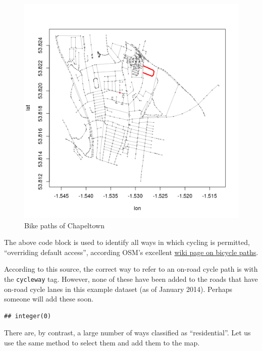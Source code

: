 \documentclass[]{article}
\newenvironment{Shaded}{}{}
\newcommand{\KeywordTok}[1]{\textcolor[rgb]{0.00,0.44,0.13}{\textbf{{#1}}}}
\newcommand{\StringTok}[1]{\textcolor[rgb]{0.25,0.44,0.63}{{#1}}}
\newcommand{\NormalTok}[1]{{#1}}
\begin{document}
\begin{figure}[htbp]
\centering
\includegraphics{figure/Bike_paths_of_Chapeltown.png}
\caption{Bike paths of Chapeltown}
\end{figure}

The above code block is used to identify all ways in which cycling is
permitted, ``overriding default access'', according OSM's excellent
\href{http://wiki.openstreetmap.org/wiki/Bicycle}{wiki page on bicycle
paths}.

According to this source, the correct way to refer to an on-road cycle
path is with the \texttt{cycleway} tag. However, none of these have been
added to the roads that have on-road cycle lanes in this example dataset
(as of January 2014). Perhaps someone will add these soon.

\begin{Shaded}
\end{Shaded}

\begin{verbatim}
## integer(0)
\end{verbatim}

There are, by contrast, a large number of ways classified as
``residential''. Let us use the same method to select them and add them
to the map.
\end{document}
